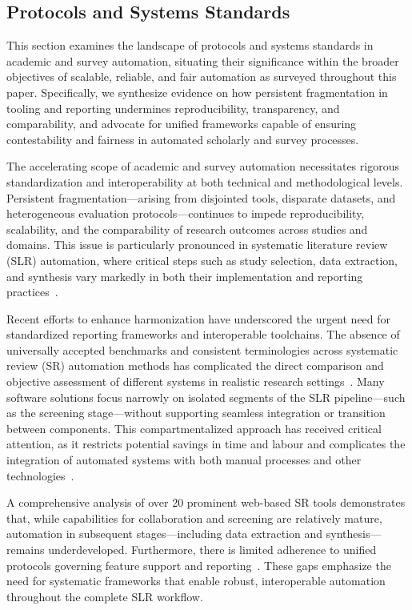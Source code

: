 \documentclass[sigconf]{acmart}
\begin{document}
\subsection{Protocols and Systems Standards}

This section examines the landscape of protocols and systems standards in academic and survey automation, situating their significance within the broader objectives of scalable, reliable, and fair automation as surveyed throughout this paper. Specifically, we synthesize evidence on how persistent fragmentation in tooling and reporting undermines reproducibility, transparency, and comparability, and advocate for unified frameworks capable of ensuring contestability and fairness in automated scholarly and survey processes.

The accelerating scope of academic and survey automation necessitates rigorous standardization and interoperability at both technical and methodological levels. Persistent fragmentation—arising from disjointed tools, disparate datasets, and heterogeneous evaluation protocols—continues to impede reproducibility, scalability, and the comparability of research outcomes across studies and domains. This issue is particularly pronounced in systematic literature review (SLR) automation, where critical steps such as study selection, data extraction, and synthesis vary markedly in both their implementation and reporting practices~\cite{ref29,ref37,ref38,ref43,ref61,ref62,ref63,ref68,ref78,ref80,ref86,ref87,ref88,ref89,ref90,ref96,ref98,ref106}.

Recent efforts to enhance harmonization have underscored the urgent need for standardized reporting frameworks and interoperable toolchains. The absence of universally accepted benchmarks and consistent terminologies across systematic review (SR) automation methods has complicated the direct comparison and objective assessment of different systems in realistic research settings~\cite{ref37,ref63,ref86,ref106}. Many software solutions focus narrowly on isolated segments of the SLR pipeline—such as the screening stage—without supporting seamless integration or transition between components. This compartmentalized approach has received critical attention, as it restricts potential savings in time and labour and complicates the integration of automated systems with both manual processes and other technologies~\cite{ref29,ref37,ref38,ref80}.

A comprehensive analysis of over 20 prominent web-based SR tools demonstrates that, while capabilities for collaboration and screening are relatively mature, automation in subsequent stages—including data extraction and synthesis—remains underdeveloped. Furthermore, there is limited adherence to unified protocols governing feature support and reporting~\cite{ref29,ref62,ref63,ref68,ref78}. These gaps emphasize the need for systematic frameworks that enable robust, interoperable automation throughout the complete SLR workflow.
\end{document}
